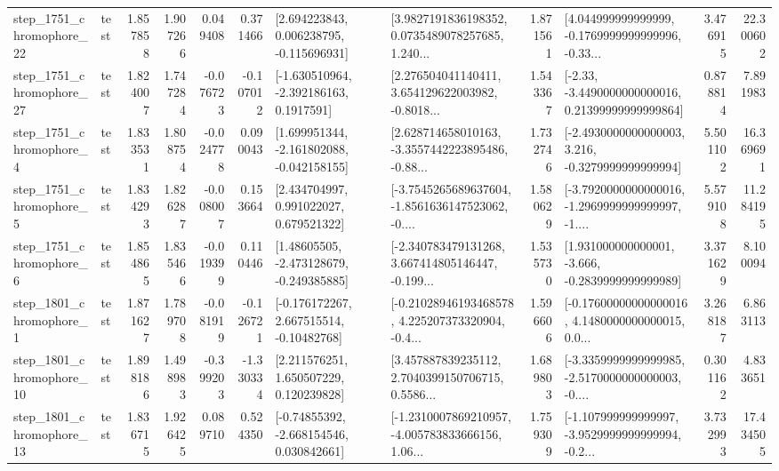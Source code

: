 \begin{tabular}{llrrrrllrlrr}
 step\_1751\_chromophore\_22 &      test &      1.857858 &    1.907266 &      0.049408 &  0.371466 &    [2.694223843, 0.006238795, -0.115696931] &  [3.9827191836198352, 0.0735489078257685, 1.240... &       1.871561 &  [4.044999999999999, -0.1769999999999996, -0.33... &            3.476915 &         22.300602 \\
 step\_1751\_chromophore\_27 &      test &      1.824007 &    1.747284 &     -0.076723 & -0.107012 &     [-1.630510964, -2.392186163, 0.1917591] &  [2.276504041140411, 3.654129622003982, -0.8018... &       1.543367 &  [-2.33, -3.4490000000000016, 0.21399999999999864] &            0.878814 &          7.891983 \\
  step\_1751\_chromophore\_4 &      test &      1.833531 &    1.808754 &     -0.024778 &  0.090043 &   [1.699951344, -2.161802088, -0.042158155] &  [2.628714658010163, -3.3557442223895486, -0.88... &       1.732746 &  [-2.4930000000000003, 3.216, -0.3279999999999994] &            5.501102 &         16.369691 \\
  step\_1751\_chromophore\_5 &      test &      1.834293 &    1.826287 &     -0.008007 &  0.153664 &     [2.434704997, 0.991022027, 0.679521322] &  [-3.7545265689637604, -1.8561636147523062, -0.... &       1.580629 &  [-3.7920000000000016, -1.2969999999999997, -1.... &            5.579108 &         11.284195 \\
  step\_1751\_chromophore\_6 &      test &      1.854865 &    1.835466 &     -0.019399 &  0.110446 &    [1.48605505, -2.473128679, -0.249385885] &  [-2.340783479131268, 3.667414805146447, -0.199... &       1.535730 &   [1.931000000000001, -3.666, -0.2839999999999989] &            3.371629 &          8.100094 \\
  step\_1801\_chromophore\_1 &      test &      1.871627 &    1.789708 &     -0.081919 & -0.126721 &    [-0.176172267, 2.667515514, -0.10482768] &  [-0.21028946193468578, 4.225207373320904, -0.4... &       1.596606 &  [-0.17600000000000016, 4.1480000000000015, 0.0... &            3.268187 &          6.863113 \\
 step\_1801\_chromophore\_10 &      test &      1.898186 &    1.498983 &     -0.399203 & -1.330334 &     [2.211576251, 1.650507229, 0.120239828] &  [3.457887839235112, 2.7040399150706715, 0.5586... &       1.689803 &  [-3.3359999999999985, -2.5170000000000003, -0.... &            0.301162 &          4.833651 \\
 step\_1801\_chromophore\_13 &      test &      1.836715 &    1.926425 &      0.089710 &  0.524350 &    [-0.74855392, -2.668154546, 0.030842661] &  [-1.2310007869210957, -4.005783833666156, 1.06... &       1.759309 &  [-1.107999999999997, -3.9529999999999994, -0.2... &            3.732993 &         17.434505 \\

\end{tabular}
